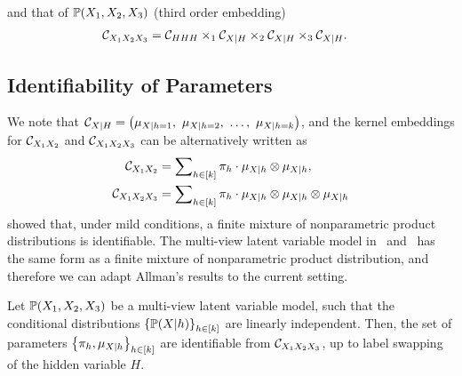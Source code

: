 \documentclass{article}
\begin{document}
and that of $\mathbb{P}(X_1,X_2,X_3)$ (third order embedding)
\begin{align}
  &\mathcal{C}_{X_1 X_2 X_3}
  = \mathcal{C}_{HHH} \times_1 \mathcal{C}_{X|H} \times_2 \mathcal{C}_{X|H} \times_3 \mathcal{C}_{X|H}. \label{eq:triple_factorization}
\end{align}

\vspace{-3mm}
\subsection{Identifiability of Parameters}
\vspace{-2mm}

We note that $\mathcal{C}_{X|H} = \left(\mu_{X|h=1},\ \mu_{X|h=2},\ \ldots,\ \mu_{X|h=k}\right)$, and the kernel embeddings for $\mathcal{C}_{X_1 X_2}$ and $\mathcal{C}_{X_1 X_2 X_3}$ can be alternatively written as
\begin{align}
	\mathcal{C}_{X_1 X_2}
  & = \sum\nolimits_{h \in [k]} \pi_h\cdot \mu_{X|h} \otimes \mu_{X|h}, \label{eq:joint2} \\
  \mathcal{C}_{X_1 X_2 X_3}
  &= \sum\nolimits_{h \in [k]} \pi_h\cdot \mu_{X|h} \otimes \mu_{X|h} \otimes \mu_{X|h} \label{eq:joint3}
\end{align}
\citet{AllMatRho09} showed that, under mild conditions, a finite mixture of nonparametric product distributions is identifiable. The multi-view latent variable model in~ and~ has the same form as a finite mixture of nonparametric product distribution, and therefore we can adapt Allman's results to the current setting.
\begin{proposition}[Identifiability]\label{prop:identifiability}
\vspace{-2mm}
  Let $\mathbb{P}(X_1,X_2,X_3)$ be a multi-view latent variable model, such that the conditional distributions $\left\{\mathbb{P}(X|h)\right\}_{h \in [k]}$ are linearly independent. Then, the set of parameters $\left\{\pi_h, \mu_{X|h}\right\}_{h \in [k]}$ are identifiable from $\mathcal{C}_{X_1 X_2 X_3}$, up to label swapping of the hidden variable $H$.
\vspace{-2mm}
\end{proposition}
\end{document}
